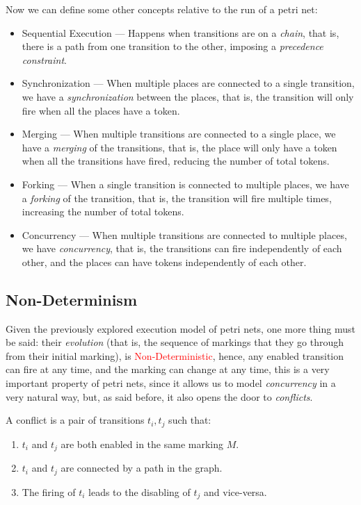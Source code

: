 \documentclass[openright, twoside, twocolumn, a4paper, 10pt]{report}
\begin{document}
Now we can define some other concepts relative to the run of a petri net:

\begin{itemize}
	\item Sequential Execution --- Happens when transitions are on a \emph{chain}, that is, there is a path from one transition to the other, imposing a \emph{precedence constraint}.
	\item Synchronization --- When multiple places are connected to a single transition, we have a \emph{synchronization} between the places, that is, the transition will only fire when all the places have a token.
	\item Merging --- When multiple transitions are connected to a single place, we have a \emph{merging} of the transitions, that is, the place will only have a token when all the transitions have fired, reducing the number of total tokens.
	\item Forking --- When a single transition is connected to multiple places, we have a \emph{forking} of the transition, that is, the transition will fire multiple times, increasing the number of total tokens.
	\item Concurrency --- When multiple transitions are connected to multiple places, we have \emph{concurrency}, that is, the transitions can fire independently of each other, and the places can have tokens independently of each other.
\end{itemize}
\subsection{Non-Determinism}

Given the previously explored execution model of petri nets, one more thing must be said:
their \emph{evolution} (that is, the sequence of markings that they go through from their initial marking), is \textcolor{red}{Non-Deterministic}, hence, any enabled transition can fire at any time, and the marking can change at any time, this is a very important property of petri nets, since it allows us to model \emph{concurrency} in a very natural way, but, as said before, it also opens the door to \emph{conflicts}.

\begin{definition}[Conflicts]\label{def:conflicts}

	A conflict is a pair of transitions $t_i, t_j$ such that:

	\begin{enumerate}
		\item $t_i$ and $t_j$ are both enabled in the same marking $M$.
		\item $t_i$ and $t_j$ are connected by a path in the graph.
		\item The firing of $t_i$ leads to the disabling of $t_j$ and vice-versa.
	\end{enumerate}

\end{definition}
\end{document}

